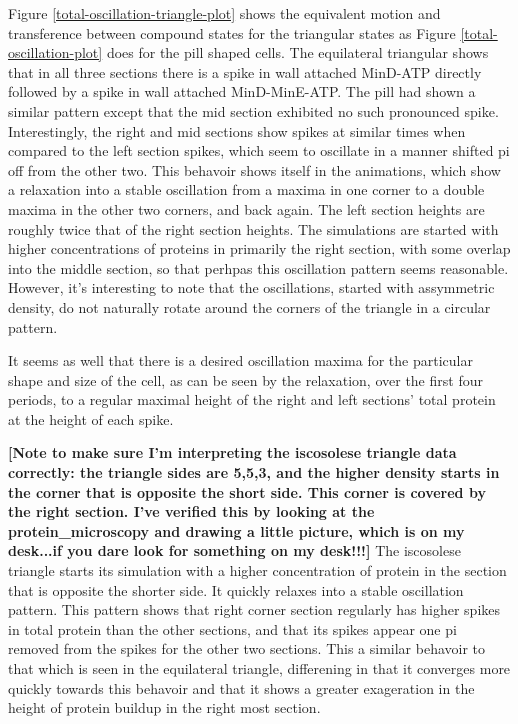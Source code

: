 \documentclass[letterpaper,twocolumn,amsmath,amssymb,pre]{revtex4-1}
\newcommand{\red}[1]{{\bf \color{red} #1}}
\newcommand{\fixme}[1]{\red{[#1]}}
\begin{document}
Figure \ref{total-oscillation-triangle-plot} shows the equivalent
motion and transference between compound states for the triangular
states as Figure \ref{total-oscillation-plot} does for the pill shaped
cells.  The equilateral triangular shows that in all three sections
there is a spike in wall attached MinD-ATP directly followed by a
spike in wall attached MinD-MinE-ATP.  The pill had shown a similar
pattern except that the mid section exhibited no such pronounced
spike.  Interestingly, the right and mid sections show spikes at
similar times when compared to the left section spikes, which seem to
oscillate in a manner shifted pi off from the other two.  This
behavoir shows itself in the animations, which show a relaxation into
a stable oscillation from a maxima in one corner to a double maxima in
the other two corners, and back again.  The left section heights are
roughly twice that of the right section heights.  The simulations are
started with higher concentrations of proteins in primarily the right
section, with some overlap into the middle section, so that perhpas
this oscillation pattern seems reasonable.  However, it's interesting
to note that the oscillations, started with assymmetric density, do
not naturally rotate around the corners of the triangle in a circular
pattern.


It seems as well that there is a desired oscillation maxima for the
particular shape and size of the cell, as can be seen by the
relaxation, over the first four periods, to a regular maximal height
of the right and left sections' total protein at the height of each spike.

\fixme{Note to make sure I'm interpreting the iscosolese triangle data
  correctly: the triangle sides are 5,5,3, and the higher density
  starts in the corner that is opposite the short side.  This corner
  is covered by the right section.  I've verified this by looking at
  the protein\_microscopy and drawing a little picture, which is on my
  desk...if you dare look for something on my desk!!!}  The iscosolese
triangle starts its simulation with a higher concentration of protein
in the section that is opposite the shorter side.  It quickly relaxes
into a stable oscillation pattern.  This pattern shows that right
corner section regularly has higher spikes in total protein than the
other sections, and that its spikes appear one pi removed from the
spikes for the other two sections.  This a similar behavoir to that
which is seen in the equilateral triangle, differening in that it
converges more quickly towards this behavoir and that it shows a
greater exageration in the height of protein buildup in the right most
section.
\end{document}
